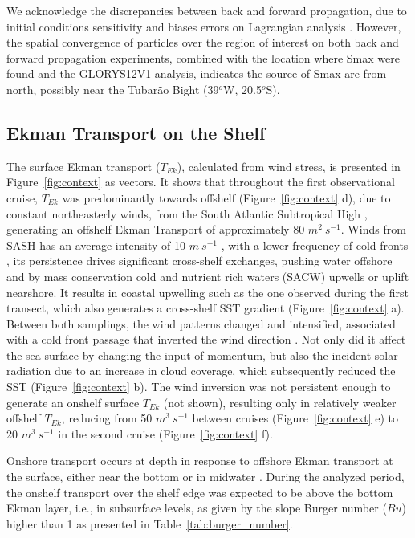 \documentclass[draft]{agujournal2019}
\begin{document}
We acknowledge the discrepancies between back and forward propagation, due to initial conditions sensitivity and biases errors on Lagrangian analysis \cite{reijnders2026stability}. However, the spatial convergence of particles over the region of interest on both back and forward propagation experiments, combined with the location where Smax were found and the GLORYS12V1 analysis, indicates the source of Smax are from north, possibly near the Tubarão Bight (39$^o$W, 20.5$^o$S).

\subsection{Ekman Transport on the Shelf}
\label{sub:ekman}

The surface Ekman transport ($T_{Ek}$), calculated from wind stress, is presented in Figure~\ref{fig:context} as vectors. It shows that throughout the first observational cruise, $T_{Ek}$ was predominantly towards offshelf (Figure~\ref{fig:context} d), due to constant northeasterly winds, from the South Atlantic Subtropical High \cite<SASH, >{stech1990estudo}, generating an offshelf Ekman Transport of approximately 80 $m^2\ s^{-1}$. Winds from SASH has an average intensity of 10 $m\ s^{-1}$ \cite{pimenta2019brazil}, with a lower frequency of cold fronts \cite{stech1990estudo}, its persistence drives significant cross-shelf exchanges, pushing water offshore and by mass conservation cold and nutrient rich waters (SACW) upwells or uplift nearshore. It results in coastal upwelling such as the one observed during the first transect, which also generates a cross-shelf SST gradient (Figure~\ref{fig:context} a). Between both samplings, the wind patterns changed and intensified, associated with a cold front passage that inverted the wind direction \cite{stech1990estudo}. Not only did it affect the sea surface by changing the input of momentum, but also the incident solar radiation due to an increase in cloud coverage, which subsequently reduced the SST (Figure~\ref{fig:context} b). The wind inversion was not persistent enough to generate an onshelf surface $T_{Ek}$ (not shown), resulting only in relatively weaker offshelf $T_{Ek}$, reducing from 50 $m^3\ s^{-1}$ between cruises (Figure~\ref{fig:context} e) to 20 $m^3\ s^{-1}$ in the second cruise (Figure~\ref{fig:context} f).

Onshore transport occurs at depth in response to offshore Ekman transport at the surface, either near the bottom or in midwater \cite{LentzChapman2004}. During the analyzed period, the onshelf transport over the shelf edge was expected to be above the bottom Ekman layer, i.e., in subsurface levels, as given by the slope Burger number ($Bu$) higher than 1 \cite{LentzChapman2004} as presented in Table~\ref{tab:burger_number}.
\end{document}
